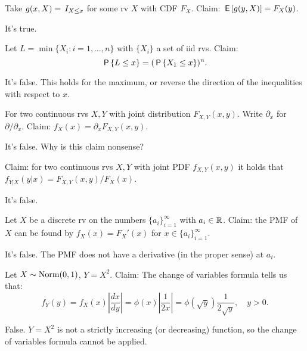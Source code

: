 \documentclass[tf-tutorial-all.tex]{subfiles}
\begin{document}
\begin{truefalse}
Take $g(x, X) = \1{X\leq x}$ for some rv $X$ with CDF $F_{X}$. Claim: $\E{g(y, X)} = F_{X}(y)$.
\begin{solution}
It's true.
\end{solution}
\end{truefalse}




\begin{truefalse}
Let $L = \min\{X_{i} : i =1, \ldots, n\}$ with $\{X_{i}\}$ a set of iid rvs.
Claim:
\begin{equation}
\P{L\leq x} = (\P{X_{1} \leq x})^{n}.
\end{equation}
\begin{solution}
It's false. This holds for the maximum, or reverse the direction of the inequalities with respect to $x$.
\end{solution}
\end{truefalse}

\begin{truefalse}
For two continuous rvs $X, Y$ with joint distribution $F_{X,Y}(x,y)$. Write $\partial_{x}$ for $\partial/ \partial_{x}$.
Claim: $f_{X}(x) = \partial_{x} F_{X,Y}(x,y)$.
\begin{solution}
It's false. Why is this claim nonsense?
\end{solution}
\end{truefalse}

\begin{truefalse}
Claim: for two continuous rvs $X, Y$ with joint PDF $f_{X,Y}(x,y)$ it holds that $f_{Y|X}(y|x) = F_{X,Y}(x,y)/F_{X}(x)$.
\begin{solution}
It's false.
\end{solution}
\end{truefalse}

\begin{truefalse}
Let $X$ be a discrete rv on the numbers $\{a_{i}\}_{i=1}^{\infty}$ with $a_{i} \in \R$.
Claim: the PMF of $X$ can be found by $f_{X}(x) = F_{X}'(x)$ for $x\in \{a_{i}\}_{i=1}^{\infty}$.
\begin{solution}
It's false. The PMF does not have a derivative (in the proper sense) at $a_{i}$.
\end{solution}
\end{truefalse}

\begin{truefalse}
    Let $X \sim \Norm{0,1}$, $Y=X^2$. Claim: The change of variables formula tells us that:
    $$f_Y(y)=f_X(x)\left|\frac{dx}{dy}\right|=\phi(x)\left|\frac{1}{2x}\right|=\phi(\sqrt{y})\frac{1}{2\sqrt{y}},\quad y>0.$$
    \begin{solution}
        False. $Y=X^2$ is not a strictly increasing (or decreasing) function, so the change of variables formula cannot be applied.
    \end{solution}
\end{truefalse}
\end{document}
